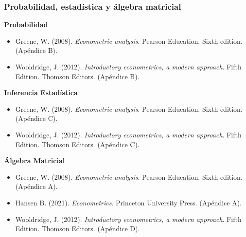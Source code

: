 \documentclass[10pt, xcolor=dvipsnames]{beamer}
\begin{document}
\begin{frame}\frametitle{Probabilidad, estadística y álgebra matricial}
\textbf{Probabilidad}\vspace{-0.2cm}	
	\begin{itemize}
	\fontvic
    \item Greene, W. (2008). \textit{Econometric analysis}. Pearson Education. Sixth edition. (Apéndice B).
    \item Wooldridge, J. (2012). \textit{Introductory econometrics, a modern approach}. Fifth Edition. Thomson Editors. (Apéndice B). \vspace{-0.1cm}
	\end{itemize}		
\textbf{Inferencia Estadística}\vspace{-0.2cm}
	\begin{itemize}
	\fontvic	
    \item Greene, W. (2008). \textit{Econometric analysis}. Pearson Education. Sixth edition. (Apéndice C).
    \item Wooldridge, J. (2012). \textit{Introductory econometrics, a modern approach}. Fifth Edition. Thomson Editors. (Apéndice C).\vspace{-0.1cm}
	\end{itemize}
\textbf{Álgebra Matricial}\vspace{-0.2cm}	
	\begin{itemize}
	\fontvic	
    \item Greene, W. (2008). \textit{Econometric analysis}. Pearson Education. Sixth edition. (Apéndice A).
    \item Hansen B. (2021). \textit{Econometrics}. Princeton University Press. (Apéndice A).
    \item Wooldridge, J. (2012). \textit{Introductory econometrics, a modern approach}. Fifth Edition. Thomson Editors. (Apéndice D).		
	\end{itemize}
\end{frame}

\end{document}
